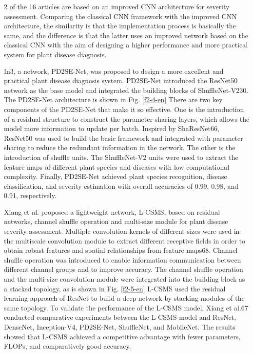 2 of the 16 articles are based on an improved CNN architecture for severity assessment. Comparing the classical CNN framework with the improved CNN architecture, the similarity is that the implementation process is basically the same, and the difference is that the latter uses an improved network based on the classical CNN with the aim of designing a higher performance and more practical system for plant disease diagnosis.

In3, a network, PD2SE-Net, was proposed to design a more excellent and practical plant disease diagnosis system. PD2SE-Net introduced the ResNet50 network as the base model and integrated the building blocks of ShuffleNet-V230. The PD2SE-Net architecture is shown in Fig. \ref{f2-4-en} There are two key components of the PD2SE-Net that make it so effective. One is the introduction of a residual structure to construct the parameter sharing layers, which allows the model more information to update per batch. Inspired by ShaResNet66, ResNet50 was used to build the basic framework and integrated with parameter sharing to reduce the redundant information in the network. The other is the introduction of shuffle units. The ShuffleNet-V2 units were used to extract the feature maps of different plant species and diseases with low computational complexity. Finally, PD2SE-Net achieved plant species recognition, disease classification, and severity estimation with overall accuracies of 0.99, 0.98, and 0.91, respectively.


Xiang et al. proposed a lightweight network, L-CSMS, based on residual networks, channel shuffle operation and multi-size module for plant disease severity assessment. Multiple convolution kernels of different sizes were used in the multiscale convolution module to extract different receptive fields in order to obtain robust features and spatial relationships from feature maps68. Channel shuffle operation was introduced to enable information communication between different channel groups and to improve accuracy. The channel shuffle operation and the multi-size convolution module were integrated into the building block as a stacked topology, as is shown in Fig. \ref{f2-5-en} L-CSMS used the residual learning approach of ResNet to build a deep network by stacking modules of the same topology. To validate the performance of the L-CSMS model, Xiang et al.67 conducted comparative experiments between the L-CSMS model and ResNet, DenseNet, Inception-V4, PD2SE-Net, ShuffleNet, and MobileNet. The results showed that L-CSMS achieved a competitive advantage with fewer parameters, FLOPs, and comparatively good accuracy.

